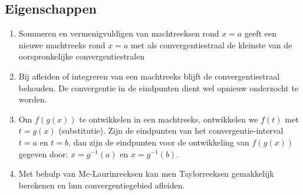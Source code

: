 \subsection{Eigenschappen}
\begin{enumerate}
    \item Sommeren en vermenigvuldigen van machtreeksen rond $x = a$ geeft een nieuwe machtreeks rond $x = a$ met als convergentiestraal de kleinste van de oorspronkelijke convergentiestralen 
    \item Bij afleiden of integreren van een machtreeks blijft de convergentiestraal behouden. De convergentie in de eindpunten dient wel opnieuw onderzocht te worden.
    \item Om $f(g(x))$ te ontwikkelen in een machtreeks, ontwikkelen we $f(t)$ met $t = g(x)$ (substitutie). Zijn de eindpunten van het convergentie-interval $t = a$ en $t = b$, dan zijn de eindpunten voor de ontwikkeling van $f(g(x))$ gegeven door: $x = g^{-1}(a)$ en $x = g^{-1}(b)$.
    
    \item Met behulp van Mc-Laurinreeksen kan men Taylorreeksen gemakkelijk berekenen en hun convergentiegebied afleiden.
\end{enumerate}

